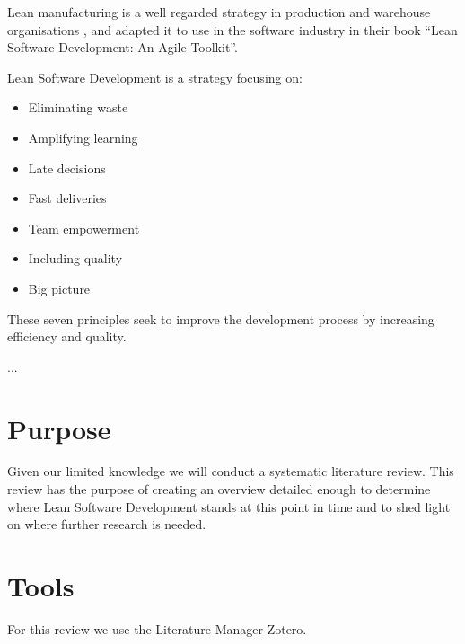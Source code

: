 Lean manufacturing is a well regarded strategy in production and warehouse organisations , and \citet{poppendieck2003} adapted it to use in the software industry in their book ``Lean Software Development: An Agile Toolkit''.

Lean Software Development is a strategy focusing on: 
\begin{itemize}
	\item Eliminating waste
	\item Amplifying learning
	\item Late decisions
	\item Fast deliveries
	\item Team empowerment
	\item Including quality
	\item Big picture
\end{itemize}

These seven principles seek to improve the development process by increasing efficiency and quality.

...

\section{Purpose}
Given our limited knowledge we will conduct a systematic literature review.
This review has the purpose of creating an overview detailed enough to determine where Lean Software Development stands at this point in time and to shed light on where further research is needed. 



\section{Tools}
For this review we use the Literature Manager Zotero.
